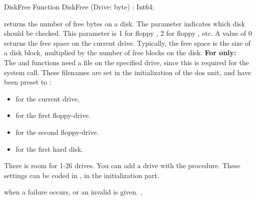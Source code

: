\begin{function}{DiskFree}
\Declaration
Function DiskFree (Drive: byte) : Int64;
\Description

 returns the number of free bytes on a disk. The parameter
 indicates which disk should be checked. This parameter is 1 for
floppy , 2 for floppy , etc. A value of 0 returns the free
space on the current drive. 
Typically, the free space is the size of a disk block, multiplied by the
number of free blocks on the disk.
\textbf{For \linux only:}\\
The  and  functions need a file on the 
specified drive, since this is required for the  system call.
These filenames are set in the initialization of the dos unit, and have 
been preset to :
\begin{itemize}
\item {} for the current drive, 
\item {} for the first floppy-drive.
\item {} for the second floppy-drive.
\item {} for the first hard disk.
\end{itemize}
There is room for 1-26 drives. You can add a drive with the
 procedure.
These settings can be coded in , in the initialization part.

 when a failure occurs, or an invalid  is given.
\SeeAlso
{}, 
\end{function}


